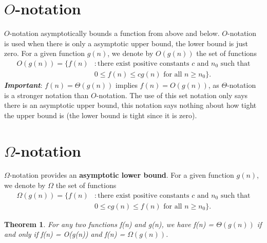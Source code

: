 \documentclass{article}
\newtheorem{theorem}{Theorem}
\begin{document}
\section*{$O$-notation}
$O$-notation asymptotically bounds a function from above and below. $O$-notation is used when there is only a asymptotic upper bound, the lower bound is just zero. \newline
For a given function $g(n)$, we denote by $O{(g(n))}$ the set of functions\newline
\begin{equation*}
\begin{split}
O{(g(n))} = \{f(n) & : \text{there exist positive constants } c\text{ and } n_0 \text{ such that}\\
  & 0 \leq f(n) \leq cg(n) \text{ for all } n \geq n_0\}.
\end{split}
\end{equation*}
\textbf{\emph{Important}}: $f(n)=\Theta{(g(n))}$ implies $f(n)=O{(g(n))}$, as $\Theta$-notation is a stronger notation than $O$-notation. The use of this set notation only says there is an asymptotic upper bound, this notation says nothing about how tight the upper bound is (the lower bound is tight since it is zero).

\section*{$\Omega$-notation}
$\Omega$-notation provides an \textbf{asymptotic lower bound}.\newline
For a given function $g(n)$, we denote by $\Omega$ the set of functions\newline
\begin{equation*}
\begin{split}
\Omega{(g(n))} = \{f(n) & : \text{there exist positive constants } c\text{ and } n_0 \text{ such that}\\
  & 0 \leq cg(n) \leq f(n) \text{ for all } n \geq n_0\}.
\end{split}
\end{equation*}

\begin{theorem}
For any two functions f(n) and g(n), we have f(n) = $\Theta{(g(n))}$ if and only if f(n) = O(g(n)) and f(n) = $\Omega{(g(n))}$.
\end{theorem}
\end{document}
